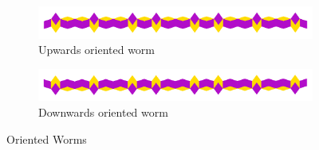 \documentclass[
  oneside,
  11pt, a4paper,
  footinclude=true,
  headinclude=true,
  cleardoublepage=empty
]{scrbook}
\begin{document}
\begin{figure}[h]
\centering
\begin{subfigure}{\textwidth}
\centering
\includegraphics[width=\textwidth]{Worm}
\caption{Upwards oriented worm}
\end{subfigure}

\begin{subfigure}{\textwidth}
\centering
\includegraphics[width=\textwidth]{WormDown}
\caption{Downwards oriented worm}
\end{subfigure}

\caption{Oriented Worms}
\label{fig:worm}
\end{figure}
\end{document}
